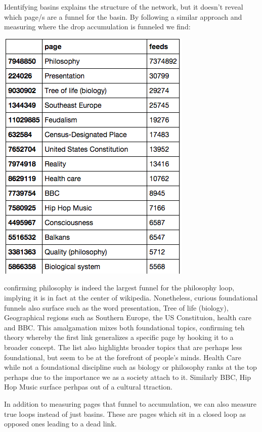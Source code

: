 \documentclass[twoside]{article}
\newcommand{\red}[1]{{\leavevmode\color{sred}{#1}}} %
\begin{document}
\begin{multicols}{2}
Identifying basins explains the structure of the network, but it doesn't reveal which page/s are a funnel for the basin. By following a similar approach and measuring where the drop accumulation is funneled we find:


\includegraphics[scale=0.5]{graphics/top_funnels.png}


confirming philosophy is indeed the largest funnel for the philosophy loop, implying it is in fact at the center of wikipedia. Nonetheless, curious foundational funnels also surface such as the word presentation, Tree of life (biology), Geographical regions such as Southern Europe, the US Constituion, health care and BBC. 
This amalgamation mixes both foundational topics, confirming teh theory whereby the first link generalizes a specific page by hooking it to a broader concept. The list also highlights broader topics that are perhaps less foundational, but seem to be at the forefront of people's minds. Health Care while not a foundational discipline such as biology or philosophy ranks at the top perhaps due to the importance we as a society attach to it. Similarly BBC, Hip Hop Music surface perhpas out of a cultural ttraction. 


\red{how many two loops are there compared to the rest of wikipedia?}

In addition to measuring pages that funnel to accumulation, we can also measure true loops instead of just basins. These are pages which sit in a closed loop as opposed ones leading to a dead link.


\end{multicols}
\end{document}
